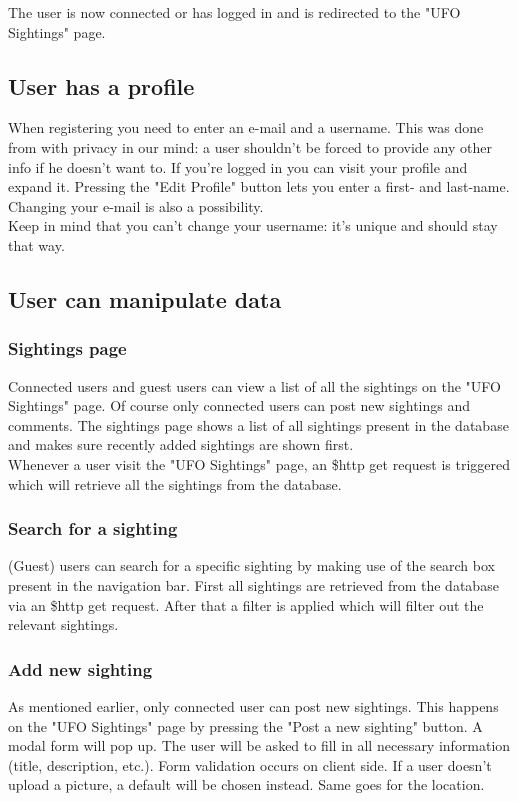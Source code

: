\documentclass{article}
\begin{document}
The user is now connected or has logged in and is redirected to the "UFO Sightings" page.

\subsection{User has a profile}
When registering you need to enter an e-mail and a username. This was done from with privacy in our mind: a user shouldn't be forced to provide any other info if he doesn't want to. If you're logged in you can visit your profile and expand it. Pressing the "Edit Profile" button lets you enter a first- and last-name. Changing your e-mail is also a possibility. \\

Keep in mind that you can't change your username: it's unique and should stay that way.

\subsection{User can manipulate data}

\subsubsection{Sightings page}
Connected users and guest users can view a list of all the sightings on the "UFO Sightings" page. Of course only connected users can post new sightings and comments. The sightings page shows a list of all sightings present in the database and makes sure recently added sightings are shown first. \\

Whenever a user visit the "UFO Sightings" page, an \$http get request is triggered which will retrieve all the sightings from the database.

\subsubsection{Search for a sighting}
(Guest) users can search for a specific sighting by making use of the search box present in the navigation bar. First all sightings are retrieved from the database via an \$http get request. After that a filter is applied which will filter out the relevant sightings.

\subsubsection{Add new sighting}
As mentioned earlier, only connected user can post new sightings. This happens on the "UFO Sightings" page by pressing the "Post a new sighting" button. A modal form will pop up. The user will be asked to fill in all necessary information (title, description, etc.). Form validation occurs on client side. If a user doesn't upload a picture, a default will be chosen instead. Same goes for the location. \\
\end{document}

